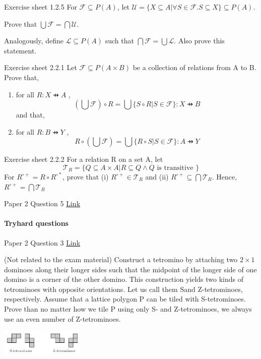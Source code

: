 \documentclass{exam}
\begin{document}
\begin{questions}
\question Exercise sheet 1.2.5 For $\mathcal{F} \subseteq P(A)$, let 
$\mathcal{U}=\{X \subseteq A | \forall S \in \mathcal{F}. S \subseteq X\} \subseteq P(A)$.

 Prove that $\bigcup \mathcal{F} = \bigcap \mathcal{U}$.
 
Analogously, define $\mathcal{L} \subseteq P(A)$ such that $\bigcap \mathcal{F} = \bigcup \mathcal{L}$. Also prove this statement.

\question Exercise sheet 2.2.1 Let $\mathcal{F} \subseteq P(A \times B)$ be a collection of relations from A to B. Prove that,
\begin{enumerate}[label=(\alph*)]
\item for all $R : X \pfun A$ ,
$$(\bigcup \mathcal{F}) \circ R = \bigcup \{S \circ R | S \in \mathcal{ F} \} : X \pfun B	$$
and that,
\item for all $R : B \pfun Y$ ,
$$R \circ (\bigcup \mathcal{F}) = \bigcup \{R \circ S | S \in \mathcal{ F} \} : A \pfun Y	$$
\end{enumerate}

\question Exercise sheet 2.2.2 For a relation R on a set A, let 
$$\mathcal{T}_R = \{Q \subseteq A \times A | R \subseteq Q \wedge Q \text{ is transitive }\}$$ 	
For $R^{\circ+} = R \circ R^{\circ*}$, prove that (i) $R^{\circ+} \in \mathcal{T}_R$ and (ii) $R^{\circ+} \subseteq \bigcap \mathcal{T}_R$. Hence, $R^{\circ+} = \bigcap \mathcal{T}_R$

 Paper 2 Question 5 \href{http://www.cl.cam.ac.uk/teaching/exams/pastpapers/y2007p2q5.pdf}{Link} 

\end{questions}

\paragraph{Tryhard questions}
\begin{questions}
 Paper 2 Question 3 \href{http://www.cl.cam.ac.uk/teaching/exams/pastpapers/y2008p2q3.pdf}{Link} 

\question (Not related to the exam material) Construct a tetromino by attaching two $2\times  1$ dominoes along their longer sides such
that the midpoint of the longer side of one domino is a corner of the other domino. This
construction yields two kinds of tetrominoes with opposite orientations. Let us call them Sand Z-tetrominoes, respectively.
Assume that a lattice polygon P can be tiled with S-tetrominoes. Prove than no matter
how we tile P using only S- and Z-tetrominoes, we always use an even number of Z-tetrominoes.

\includegraphics[width=0.3\textwidth]{tetrominos.PNG}

\end{questions}
\end{document}

